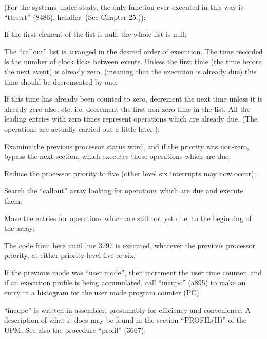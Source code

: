 (For the systems under study, the
only function ever executed in
this way is ``ttrstrt'' (8486),
handler. (See Chapter 25.));

\item[3748:] If the first element of the list
 is null, the whole list is null;

\item[3750:] The ``callout'' list is arranged in
 the desired order of execution.
 The time recorded is the number
of clock ticks between events.
Unless the first time (the time
before the next event) is already
zero, (meaning that the execution
is already due) this time should
be decremented by one.


If this time has already been
counted to zero, decrement the
next time unless it is already
zero also, etc. i.e. decrement
the first non-zero time in the
list. All the leading entries
with zero times represent operations which are already due. (The
operations are actually carried
out a little later.);

\item[3759:] Examine the previous processor
status word, and if the priority
was non-zero, bypass the next
section, which executes those
operations which are due;

\item[3766:] Reduce the processor priority to
five (other level six interrupts
may now occur);

\item[3767:] Search the ``callout'' array looking
for operations which are due and execute them;

\item[3773:] Move the entries for operations
which are still not yet due, to
 the beginning of the array;

\item[3787:] The code from here until line
3797 is executed, whatever the
previous processor priority, at
either priority level five or
six;

\item[3788:] If the previous mode was ``user
 mode'', then increment the user
 time counter, and if an execution
 profile is being accumulated,
 call ``incupc'' (a895) to make an
 entry in a histogram for the user
 mode program counter (PC).

``incupc'' is written in assembler,
presumably for efficiency and
convenience. A description of
what it does may be found in the
section ``PROFIL(II)'' of the UPM.
See also the procedure ``profil''
(3667);

